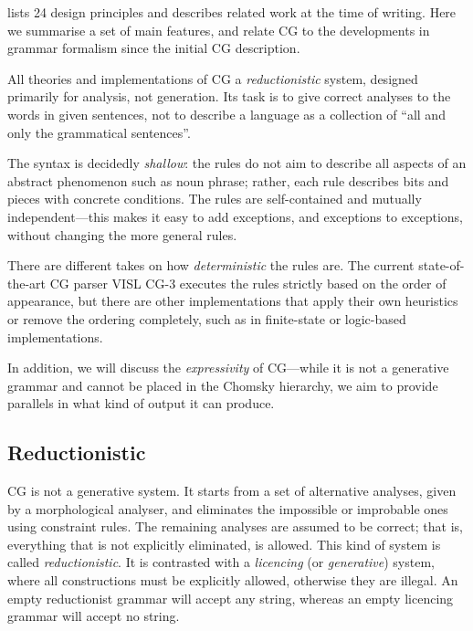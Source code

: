 \cite{karlsson1995constraint} lists 24 design principles and describes
related work at the time of writing.
Here we summarise a set of main features, and relate CG to the developments in grammar formalism since the initial CG description.

All theories and implementations of CG  a \emph{reductionistic}
system, designed primarily for analysis, not generation.
Its task is to give correct analyses to the words in given sentences,
not to describe a language as a collection of ``all and only the grammatical sentences''.

The syntax is decidedly \emph{shallow}: the rules do not aim to
describe all aspects of an abstract phenomenon such as noun phrase; 
rather, each rule describes bits and pieces with concrete conditions.
The rules are self-contained and mutually independent---this makes it 
easy to add exceptions, and exceptions to exceptions, without 
changing the more general rules.

There are different takes on how \emph{deterministic} the rules are.
The current state-of-the-art CG parser VISL CG-3 executes the rules strictly based on the order of appearance, but there
are other implementations that apply their own heuristics or remove the
ordering completely, such as in finite-state or logic-based implementations. 

In addition, we will discuss the \emph{expressivity} of CG---while it is not a generative grammar and cannot be placed in the Chomsky hierarchy, we aim to provide parallels in what kind of output it can produce.

\subsection{Reductionistic}\label{reductionist-vs.licencing}

CG is not a generative system.
It starts from a set of alternative analyses, given by a morphological analyser,
and eliminates the impossible or improbable ones using constraint rules. 
The remaining analyses are assumed to be correct; that
is, everything that is not explicitly eliminated, is allowed. 
This kind of system is called \emph{reductionistic}. It is contrasted 
with a \emph{licencing} (or \emph{generative}) system, where all constructions must
be explicitly allowed, otherwise they are illegal. 
An empty reductionist grammar will accept any string, whereas an empty
licencing grammar will accept no string.



